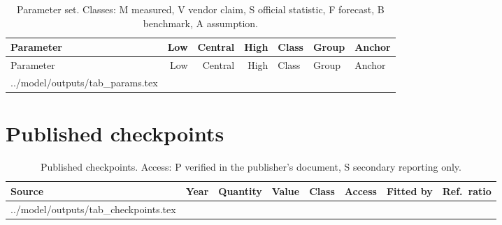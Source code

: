 \documentclass[11pt]{article}
\begin{document}
{\small
\setlength{\tabcolsep}{4pt}
\begin{longtable}{@{}>{\raggedright\arraybackslash}p{3.9cm} r r r l >{\raggedright\arraybackslash}p{2.6cm} >{\raggedright\arraybackslash}p{3.7cm}@{}}
\caption{Parameter set. Classes: M measured, V vendor claim, S official statistic, F forecast, B benchmark, A assumption.}\label{tab:params}\\
\toprule
Parameter & Low & Central & High & Class & Group & Anchor \\
\midrule
\endfirsthead
\toprule
Parameter & Low & Central & High & Class & Group & Anchor \\
\midrule
\endhead
{} ../model/outputs/tab_params.tex 
\bottomrule
\end{longtable}}

\section{Published checkpoints}\label{app:checkpoints}
\begin{table}[H]
\centering\footnotesize
\setlength{\tabcolsep}{4pt}
\caption{Published checkpoints. Access: P verified in the publisher's document, S secondary reporting only.}
\label{tab:checkpoints}
\begin{tabular}{@{}l c l r c c l r@{}}
\toprule
Source & Year & Quantity & Value & Class & Access & Fitted by & Ref.\ ratio \\
\midrule
{} ../model/outputs/tab_checkpoints.tex 
\bottomrule
\end{tabular}
\end{table}
\end{document}
